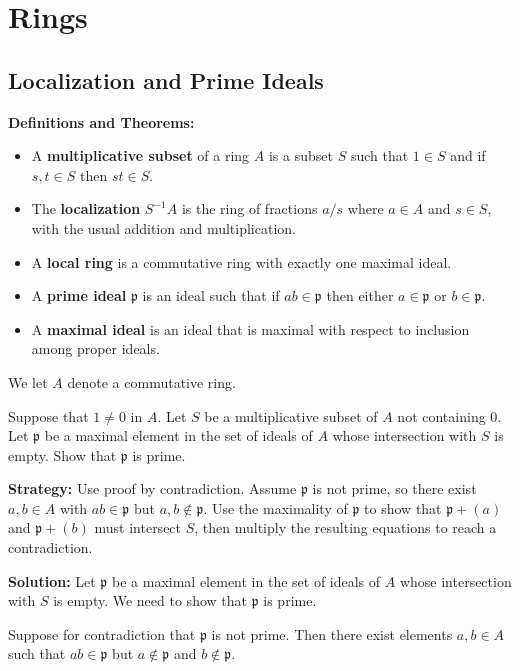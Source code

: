 \chapter{Rings}

\section{Localization and Prime Ideals}

\noindent\textbf{Definitions and Theorems:}
\begin{itemize}
\item A \textbf{multiplicative subset} of a ring $A$ is a subset $S$ such that $1 \in S$ and if $s, t \in S$ then $st \in S$.
\item The \textbf{localization} $S^{-1}A$ is the ring of fractions $a/s$ where $a \in A$ and $s \in S$, with the usual addition and multiplication.
\item A \textbf{local ring} is a commutative ring with exactly one maximal ideal.
\item A \textbf{prime ideal} $\mathfrak{p}$ is an ideal such that if $ab \in \mathfrak{p}$ then either $a \in \mathfrak{p}$ or $b \in \mathfrak{p}$.
\item A \textbf{maximal ideal} is an ideal that is maximal with respect to inclusion among proper ideals.
\end{itemize}

We let $A$ denote a commutative ring.

\begin{problembox}
Suppose that $1 \neq 0$ in $A$. Let $S$ be a multiplicative subset of $A$ not containing $0$. Let $\mathfrak{p}$ be a maximal element in the set of ideals of $A$ whose intersection with $S$ is empty. Show that $\mathfrak{p}$ is prime.
\end{problembox}

\noindent\textbf{Strategy:} Use proof by contradiction. Assume $\mathfrak{p}$ is not prime, so there exist $a, b \in A$ with $ab \in \mathfrak{p}$ but $a, b \notin \mathfrak{p}$. Use the maximality of $\mathfrak{p}$ to show that $\mathfrak{p} + (a)$ and $\mathfrak{p} + (b)$ must intersect $S$, then multiply the resulting equations to reach a contradiction.

\noindent\textbf{Solution:}
Let $\mathfrak{p}$ be a maximal element in the set of ideals of $A$ whose intersection with $S$ is empty. We need to show that $\mathfrak{p}$ is prime.

Suppose for contradiction that $\mathfrak{p}$ is not prime. Then there exist elements $a, b \in A$ such that $ab \in \mathfrak{p}$ but $a \notin \mathfrak{p}$ and $b \notin \mathfrak{p}$.

